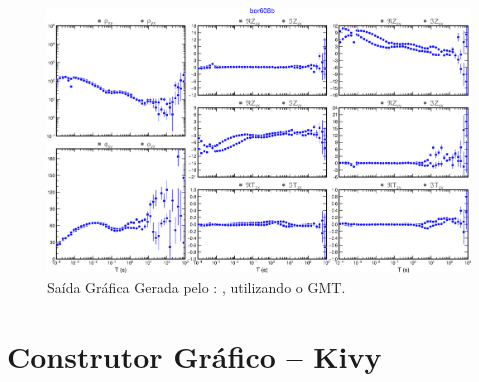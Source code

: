         \begin{figure}[H]
            \caption{Saída Gráfica Gerada pelo : , utilizando o GMT.}
                \begin{center}
                    \includegraphics[width=15cm]{texto/figura/plot-cmp-tf.png}
                \end{center}
            \label{plot-cmp-tf}
        \end{figure}

    
    \section{Construtor Gráfico -- Kivy}

    
